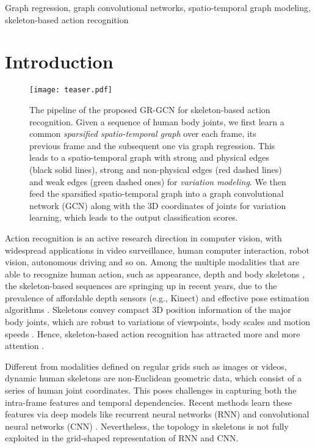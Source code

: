 \documentclass[conference]{IEEEtran}
\begin{document}
\begin{IEEEkeywords}
Graph regression, graph convolutional networks, spatio-temporal graph modeling, skeleton-based action recognition
\end{IEEEkeywords}

\vspace{-0.1in}
\section{Introduction}

\begin{figure}[htbp]
    \centering
    \texttt{[image: teaser.pdf]}
    \caption{The pipeline of the proposed GR-GCN for skeleton-based action recognition. Given a sequence of human body joints, we first learn a common \textit{sparsified spatio-temporal graph} over each frame, its previous frame and the subsequent one via graph regression. This leads to a spatio-temporal graph with strong and physical edges (black solid lines), strong and non-physical edges (red dashed lines) and weak edges (green dashed ones) for \textit{variation modeling}. We then feed the sparsified spatio-temporal graph into a graph convolutional network (GCN) along with the 3D coordinates of joints for variation learning, which leads to the output classification scores.}
    \label{fig:teaser}
\end{figure}

Action recognition is an active research direction in computer vision, with widespread applications in video surveillance, human computer interaction, robot vision, autonomous driving and so on. Among the multiple modalities \cite{simonyan2014two,tran2015learning,wang2015action,wang2016temporal,zhao2017temporal} that are able to recognize human action, such as appearance, depth and body skeletons \cite{Du15cvpr,liu16eccv}, the skeleton-based sequences are springing up in recent years, due to the prevalence of affordable depth sensors (e.g., Kinect) and effective pose estimation algorithms \cite{shotton11}. Skeletons convey compact 3D position information of the major body joints, which are robust to variations of viewpoints, body scales and motion speeds \cite{Han17cviu}. Hence, skeleton-based action recognition has attracted more and more attention \cite{Xia12cvpr,Wang12cvpr,Gowayyed13IJCAI,Wang16eccv,vemulapalli14,Wang16cvpr,Weng17cvpr}. 

Different from modalities defined on regular grids such as images or videos, dynamic human skeletons are non-Euclidean geometric data, which consist of a series of human joint coordinates. This poses challenges in capturing both the intra-frame features and temporal dependencies. Recent methods learn these features via deep models like recurrent neural networks (RNN) \cite{Du15cvpr,liu16eccv,Shahroudy_2016_CVPR,Zhu16aaai,song2016aaai,zhang17,Li_2017_ICMEW,Tanfous_CVPR_2018,Liu_2018_TPAMI} and convolutional neural networks (CNN) \cite{Li_2017_ICMEW,li17,Ke17cvpr,kim2017interpretable,Liu17pr}. Nevertheless, the topology in skeletons is not fully exploited in the grid-shaped representation of RNN and CNN. 
\end{document}
